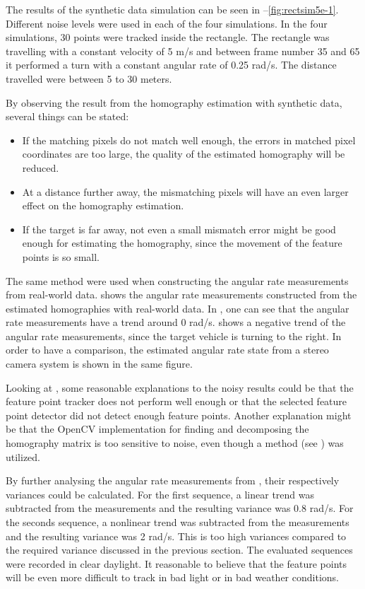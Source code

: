 The results of the synthetic data simulation can be seen in --\ref{fig:rectsim5e-1}.
Different noise levels were used in each of the four simulations.
In the four simulations, 30 points were tracked inside the rectangle.
The rectangle was travelling with a constant velocity of 5 m/s and between frame number 35 and 65 it performed a turn with a constant angular rate of 0.25 rad/s.
The distance travelled were between 5 to 30 meters.

By observing the result from the homography estimation with synthetic data, several things can be stated:
\begin{itemize}
	\item If the matching pixels do not match well enough, \ie the errors in matched pixel coordinates are too large, the quality of the estimated homography will be reduced.
	\item At a distance further away, the mismatching pixels will have an even larger effect on the homography estimation.
	\item If the target is far away, not even a small mismatch error might be good enough for estimating the homography, since the movement of the feature points is so small.
\end{itemize}

The same method were used when constructing the angular rate measurements from real-world data.
 shows the angular rate measurements constructed from the estimated homographies with real-world data.
In , one can see that the angular rate measurements have a trend around 0 rad/s.
 shows a negative trend of the angular rate measurements, since the target vehicle is turning to the right.
In order to have a comparison, the estimated angular rate state from a stereo camera system is shown in the same figure.

Looking at , some reasonable explanations to the noisy results could be that the feature point tracker does not perform well enough or that the selected feature point detector did not detect enough feature points.
Another explanation might be that the OpenCV implementation for finding and decomposing the homography matrix is too sensitive to noise, even though a \abbrRANSAC method (see ) was utilized.

By further analysing the angular rate measurements from , their respectively variances could be calculated.
For the first sequence, a linear trend was subtracted from the measurements and the resulting variance was 0.8 rad/s.
For the seconds sequence, a nonlinear trend was subtracted from the measurements and the resulting variance was 2 rad/s.
This is too high variances compared to the required variance discussed in the previous section.
The evaluated sequences were recorded in clear daylight.
It reasonable to believe that the feature points will be even more difficult to track in bad light or in bad weather conditions.

